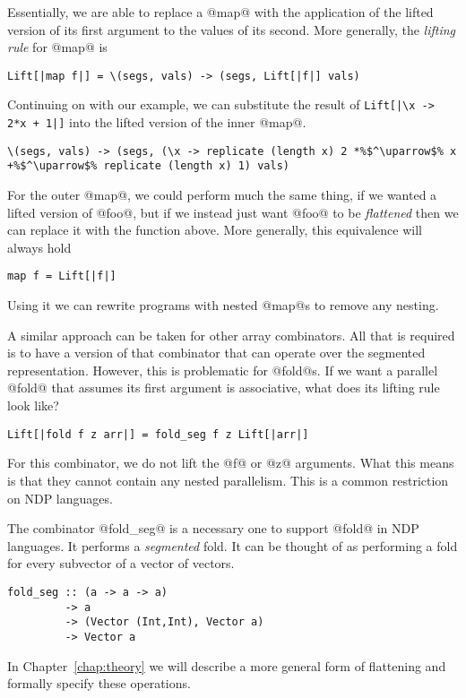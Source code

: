 %
Essentially, we are able to replace a @map@ with the application of the lifted version of its first argument to the values of its second. More generally, the \emph{lifting rule} for @map@ is
%
\begin{lstlisting}[style=ndp]
Lift[|map f|] = \(segs, vals) -> (segs, Lift[|f|] vals)
\end{lstlisting}
%
Continuing on with our example, we can substitute the result of \lstinline[style=ndp]{Lift[|\x -> 2*x + 1|]} into the lifted version of the inner @map@.
%
\begin{lstlisting}
\(segs, vals) -> (segs, (\x -> replicate (length x) 2 *%$^\uparrow$% x +%$^\uparrow$% replicate (length x) 1) vals)
\end{lstlisting}
%
For the outer @map@, we could perform much the same thing, if we wanted a lifted version of @foo@, but if we instead just want @foo@ to be \emph{flattened} then we can replace it with the function above. More generally, this equivalence will always hold
%
\begin{lstlisting}[style=ndp]
map f = Lift[|f|]
\end{lstlisting}
%
Using it we can rewrite programs with nested @map@s to remove any nesting.

A similar approach can be taken for other array combinators. All that is required is to have a version of that combinator that can operate over the segmented representation. However, this is problematic for @fold@s. If we want a  parallel @fold@ that assumes its first argument is associative, what does its lifting rule look like?
%
\begin{lstlisting}[style=ndp]
Lift[|fold f z arr|] = fold_seg f z Lift[|arr|]
\end{lstlisting}
%
For this combinator, we do not lift the @f@ or @z@ arguments. What this means is that they cannot contain any nested parallelism. This is a common restriction on NDP languages.

The combinator @fold_seg@ is a necessary one to support @fold@ in NDP languages. It performs a \emph{segmented} fold. It can be thought of as performing a fold for every subvector of a vector of vectors.
%
\begin{lstlisting}[style=ndp]
fold_seg :: (a -> a -> a)
         -> a
         -> (Vector (Int,Int), Vector a)
         -> Vector a
\end{lstlisting}
%

In Chapter~\ref{chap:theory} we will describe a more general form of flattening and formally specify these operations.
%

